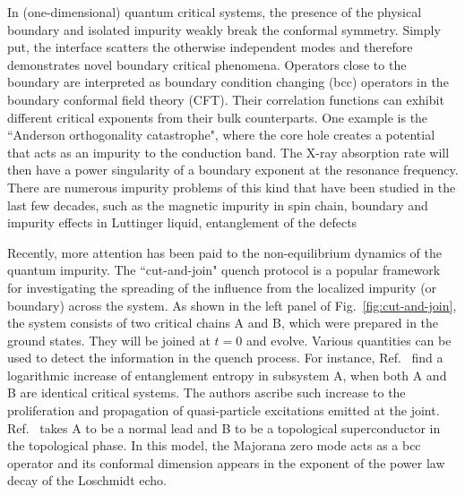 

In (one-dimensional) quantum critical systems, the presence of the physical boundary and isolated impurity weakly break the conformal symmetry. Simply put, the interface scatters the otherwise independent modes and therefore demonstrates novel boundary critical phenomena\cite{cardy_boundary_2004}. Operators close to the boundary are interpreted as boundary condition changing (bcc) operators\cite{oshikawa_boundary_1997,affleck_boundary_1997} in the boundary conformal field theory (CFT). Their correlation functions can exhibit different critical exponents from their bulk counterparts\cite{cardy_conformal_1984}. One example is the ``Anderson orthogonality catastrophe", where the core hole creates a potential that acts as an impurity to the conduction band. The X-ray absorption rate will then have a power singularity of a boundary exponent\cite{affleck_boundary_1997} at the resonance frequency. There are numerous impurity problems of this kind that have been studied in the last few decades, such as the magnetic impurity in spin chain\cite{eggert_magnetic_1992}, boundary and impurity effects in Luttinger liquid\cite{fabrizio_interacting_1995}, entanglement of the defects\cite{peschel_entanglement_2005, igloi_entanglement_2009,calabrese_entanglement_2012} \etc

Recently, more attention has been paid to the non-equilibrium dynamics of the quantum impurity\cite{hegde_quench_2015,francica_local_2016,lupo_transient_2016,lee_spatiotemporal_2016,chung_memory_2016,sacramento_edge_2016,vasseur_expansion_2015,mazza_overlap_2016}. The ``cut-and-join" quench protocol is a popular framework for investigating the spreading of the influence from the localized impurity (or boundary) across the system. As shown in the left panel of Fig.~\ref{fig:cut-and-join}, the system consists of two critical chains A and B, which were prepared in the ground states. They will be joined at $t = 0$ and evolve. Various quantities can be used to detect the information in the quench process. For instance, Ref.~ find a logarithmic increase of entanglement entropy in subsystem A, when both A and B are identical critical systems. The authors ascribe such increase to the proliferation and propagation of quasi-particle excitations emitted at the joint. Ref.~ takes A to be a normal lead and B to be a topological superconductor in the topological phase. In this model, the Majorana zero mode acts as a bcc operator and its conformal dimension appears in the exponent of the power law decay of the Loschmidt echo.

